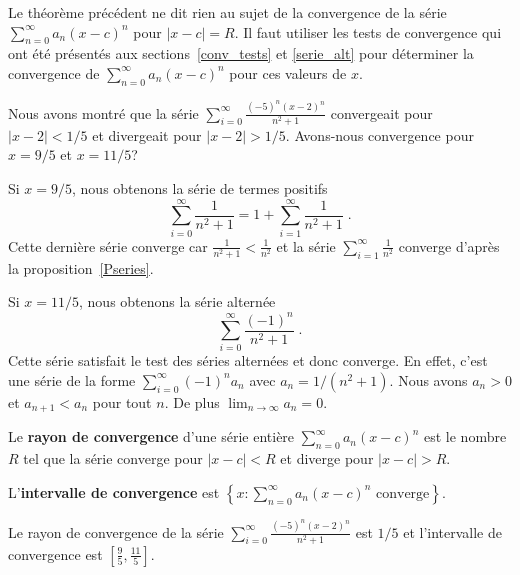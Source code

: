 {\begin{rmk}
Le théorème précédent ne dit rien au sujet de la convergence de la série
$\displaystyle \sum_{n=0}^\infty a_n (x-c)^n$ pour $|x-c|=R$.  Il
faut utiliser les tests de convergence qui ont été présentés aux
sections~\ref{conv_tests} et \ref{serie_alt} pour déterminer la convergence
de $\displaystyle \sum_{n=0}^\infty a_n (x-c)^n$ pour ces valeurs de $x$.
\end{rmk}

\begin{egg} \label{entiere_eggS}
Nous avons montré que la série
$\displaystyle \sum_{i=0}^\infty \frac{(-5)^n(x-2)^n}{n^2+1}$ convergeait
pour $|x-2|<1/5$ et divergeait pour $|x-2|>1/5$.  Avons-nous convergence
pour $x=9/5$ et $x=11/5$?

Si $x=9/5$, nous obtenons la série de termes positifs
\[
\sum_{i=0}^\infty \frac{1}{n^2+1} = 1 + \sum_{i=1}^\infty \frac{1}{n^2+1} \; .
\]
Cette dernière série converge car
$\displaystyle \frac{1}{n^2+1} < \frac{1}{n^2}$ et la série
$\displaystyle \sum_{i=1}^\infty \frac{1}{n^2}$ converge d'après la
proposition~\ref{Pseries}.

Si $x=11/5$, nous obtenons la série alternée
\[
\sum_{i=0}^\infty \frac{(-1)^n}{n^2+1} \; .
\]
Cette série satisfait le test des séries alternées et donc converge.  En
effet, c'est une série de la forme
$\displaystyle \sum_{i=0}^\infty (-1)^n a_n$ avec $a_n = 1/(n^2+1)$.  Nous avons
$a_n>0$ et $a_{n+1} < a_n$ pour tout $n$.  De plus
$\displaystyle \lim_{n\rightarrow \infty} a_n = 0$.
\end{egg}

\begin{focus}{\dfn}
Le {\bfseries rayon de convergence} d'une série entière
$\displaystyle \sum_{n=0}^\infty a_n (x-c)^n$ est le nombre $R$ tel que la
série converge pour $|x-c|<R$ et diverge pour $|x-c|>R$.

L'{\bfseries intervalle de convergence} est
$\displaystyle \left\{x : \sum_{n=0}^\infty a_n (x-c)^n
\text{ converge} \right\}$.
\end{focus}

\begin{egg}
Le rayon de convergence de la série
$\displaystyle \sum_{i=0}^\infty \frac{(-5)^n(x-2)^n}{n^2+1}$ est
$1/5$ et l'intervalle de convergence est
$\displaystyle \left[\frac{9}{5} , \frac{11}{5}\right]$.
\end{egg}

}
